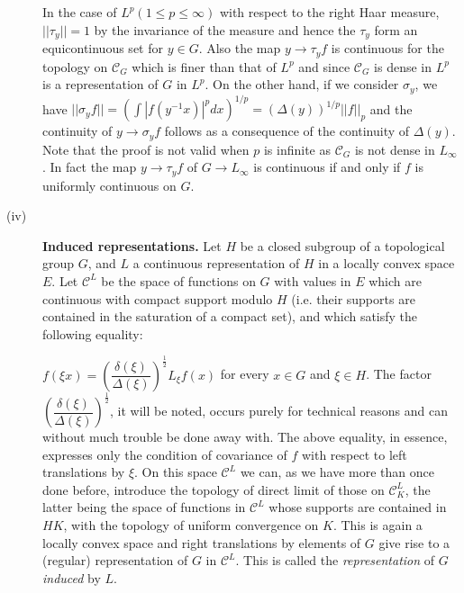 \begin{description}
In the case of $L^p (1\leq p \leq \infty)$ with respect to the
right Haar measure, $||\tau_y|| = 1$ by the invariance of the measure
and hence the $\tau_y$ form an equicontinuous set for $y\in G$. Also
the map $y \rightarrow\tau_y f$ is continuous for the topology on
$\mathscr{C}_G$ which is finer than that of $L^p$ and since
$\mathscr{C}_G$ is dense in $L^p$ is a representation of $G$ in
$L^p$. On the other hand, if we consider $\sigma_y$, we have
$||\sigma_yf|| = (\int |f(y^{-1}x)|^p dx)^{1/p} =
(\Delta(y))^{1/p}||f||_p$ and the continuity of
$y\rightarrow\sigma_yf$ follows as a consequence of the continuity of
$\Delta(y)$. Note that the proof is not valid when $p$ is
infinite as $\mathscr{C}_G$ is not dense in $L_\infty$. In fact the
map $y\rightarrow \tau_y f$ of $G\rightarrow L_\infty$ is continuous if
and only if $f$ is uniformly continuous on $G$. 

\item[(iv)] \textbf{Induced representations.} Let $H$ be a closed
  subgroup of a topological group $G$, and $L$ a continuous
  representation of $H$ in a locally convex space $E$. Let
  $\mathscr{C}^L$ be the space of functions on $G$ with values in $E$
  which are continuous with compact support modulo $H$ (i.e. their
  supports are contained in the saturation of a compact set), and
  which satisfy the following equality: 


$f(\xi x) =
\left(\dfrac{\delta(\xi)}{\Delta(\xi)}\right)^{\frac{1}{2}}
L_\xi f(x)$ for every $x\in G$ and $\xi \in H$. The factor
$\left( \dfrac{\delta(\xi)}{\Delta(\xi)}\right)^{\frac{1}{2}}$, it will be
noted, occurs purely for technical reasons and can without much
trouble be done away with. The above equality, in essence, expresses
only the condition of covariance of $f$ with respect to left
translations by $\xi$. On this space $\mathscr{C}^L$ we can, as we
have more than once done before, introduce the topology of direct
limit of those on $\mathscr{C}^L_K$,  the\pageoriginale 
latter being the space of
functions in $\mathscr{C}^L$ whose supports are contained in $HK$,
with the topology of uniform convergence on $K$. This is again a
locally convex space and right translations by elements of $G$ give
rise to a (regular) representation of $G$ in $\mathscr{C}^L$. This is
called the \textit{representation} of $G$ \textit{induced} by $L$. 


\end{description}
